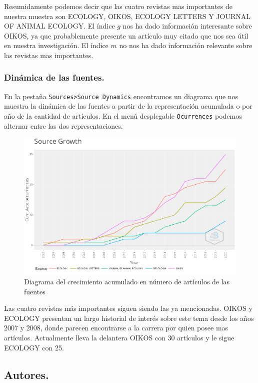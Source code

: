 \documentclass[
]{article}
\begin{document}
Resumidamente podemos decir que las cuatro revistas mas importantes de
nuestra muestra son ECOLOGY, OIKOS, ECOLOGY LETTERS Y JOURNAL OF ANIMAL
ECOLOGY. El índice \(g\) nos ha dado información interesante sobre
OIKOS, ya que probablemente presente un artículo muy citado que nos sea
útil en nuestra investigación. El índice \(m\) no nos ha dado
información relevante sobre las revistas mas importantes.

\hypertarget{dinuxe1mica-de-las-fuentes.}{%
\subsubsection{Dinámica de las
fuentes.}\label{dinuxe1mica-de-las-fuentes.}}

En la pestaña \texttt{Sources\textgreater{}Source\ Dynamics} encontramos
un diagrama que nos muestra la dinámica de las fuentes a partir de la
representación acumulada o por año de la cantidad de artículos. En el
menú desplegable \texttt{Ocurrences} podemos alternar entre las dos
representaciones.

\begin{figure}
\centering
\includegraphics{SourceGorwth.png}
\caption{Diagrama del crecimiento acumulado en número de artículos de
las fuentes}
\end{figure}

Las cuatro revistas más importantes siguen siendo las ya mencionadas.
OIKOS y ECOLOGY presentan un largo historial de interés sobre este tema
desde los años 2007 y 2008, donde parecen encontrarse a la carrera por
quien posee mas artículos. Actualmente lleva la delantera OIKOS con 30
artículos y le sigue ECOLOGY con 25.

\hypertarget{autores.}{%
\subsection{Autores.}\label{autores.}}
\end{document}

